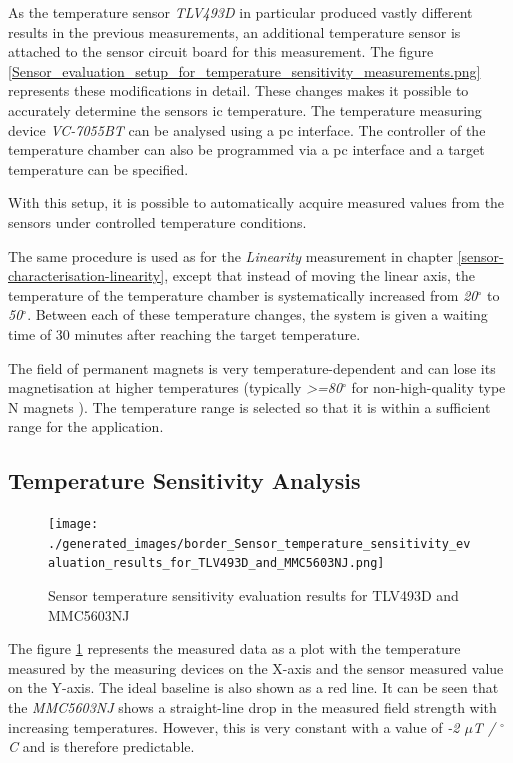 As the temperature sensor \emph{TLV493D} in particular produced vastly
different results in the previous measurements, an additional
temperature sensor is attached to the sensor circuit board for this
measurement. The figure
\ref{Sensor_evaluation_setup_for_temperature_sensitivity_measurements.png}
represents these modifications in detail. These changes makes it
possible to accurately determine the sensors \gls{ic} temperature. The
temperature measuring device \emph{VC-7055BT} can be analysed using a
\gls{pc} interface. The controller of the temperature chamber can also
be programmed via a \gls{pc} interface and a target temperature can be
specified.

With this setup, it is possible to automatically acquire measured values
from the sensors under controlled temperature conditions.

The same procedure is used as for the \emph{Linearity} measurement in
chapter \ref{sensor-characterisation-linearity}, except that instead of
moving the linear axis, the temperature of the temperature chamber is
systematically increased from \emph{20\(^{\circ}\)} to
\emph{50\(^{\circ}\)}. Between each of these temperature changes, the
system is given a waiting time of 30 minutes after reaching the target
temperature.

The field of permanent magnets is very temperature-dependent and can
lose its magnetisation at higher temperatures (typically
\emph{\textgreater=80\(^{\circ}\)} for non-high-quality type N magnets
). The temperature range is selected so that it is
within a sufficient range for the application.

\hypertarget{temperature-sensitivity-analysis}{%
\subsection{Temperature Sensitivity
Analysis}\label{temperature-sensitivity-analysis}}

\begin{figure}
\centering
\texttt{[image: ./generated\_images/border\_Sensor\_temperature\_sensitivity\_evaluation\_results\_for\_TLV493D\_and\_MMC5603NJ.png]}
\caption{Sensor temperature sensitivity evaluation results for TLV493D
and MMC5603NJ
\label{Sensor_temperature_sensitivity_evaluation_results_for_TLV493D_and_MMC5603NJ.png}}
\end{figure}

The figure
\ref{Sensor_temperature_sensitivity_evaluation_results_for_TLV493D_and_MMC5603NJ.png}
represents the measured data as a plot with the temperature measured by
the measuring devices on the X-axis and the sensor measured value on the
Y-axis. The ideal baseline is also shown as a red line. It can be seen
that the \emph{MMC5603NJ} shows a straight-line drop in the measured
field strength with increasing temperatures. However, this is very
constant with a value of \emph{-2 \(\mu\)T / \(^{\circ}\)C} and is
therefore predictable.

